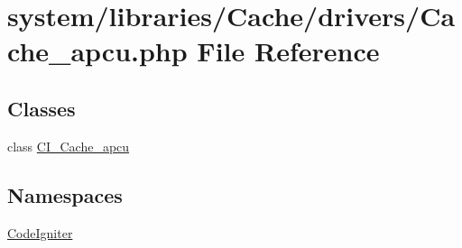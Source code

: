 \hypertarget{_cache__apcu_8php}{}\section{system/libraries/\+Cache/drivers/\+Cache\+\_\+apcu.php File Reference}
\label{_cache__apcu_8php}
\subsection*{Classes}
\begin{DoxyCompactItemize}
\item 
class \mbox{\hyperlink{class_c_i___cache__apcu}{C\+I\+\_\+\+Cache\+\_\+apcu}}
\end{DoxyCompactItemize}
\subsection*{Namespaces}
\begin{DoxyCompactItemize}
\item 
 \mbox{\hyperlink{namespace_code_igniter}{Code\+Igniter}}
\end{DoxyCompactItemize}
